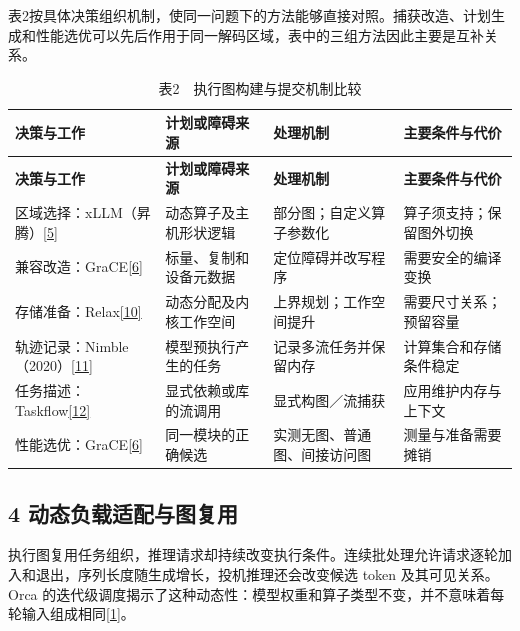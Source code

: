 \documentclass[UTF8,11pt,fontset=windows]{ctexart}
\begin{document}
表2按具体决策组织机制，使同一问题下的方法能够直接对照。捕获改造、计划生成和性能选优可以先后作用于同一解码区域，表中的三组方法因此主要是互补关系。

\begingroup\small
\begin{longtable}[]{@{}>{\raggedright\arraybackslash}p{}>{\raggedright\arraybackslash}p{}>{\raggedright\arraybackslash}p{}>{\raggedright\arraybackslash}p{}@{}}
\caption{表2　执行图构建与提交机制比较}\tabularnewline
\toprule
\textbf{决策与工作} & \textbf{计划或障碍来源} & \textbf{处理机制} & \textbf{主要条件与代价} \\
\midrule
\endfirsthead
\toprule
\textbf{决策与工作} & \textbf{计划或障碍来源} & \textbf{处理机制} & \textbf{主要条件与代价} \\
\midrule
\endhead
区域选择：xLLM（昇腾）\protect\hyperlink{ref-5}{{[}5{]}} & 动态算子及主机形状逻辑 & 部分图；自定义算子参数化 & 算子须支持；保留图外切换 \\
兼容改造：GraCE\protect\hyperlink{ref-6}{{[}6{]}} & 标量、复制和设备元数据 & 定位障碍并改写程序 & 需要安全的编译变换 \\
存储准备：Relax\protect\hyperlink{ref-10}{{[}10{]}} & 动态分配及内核工作空间 & 上界规划；工作空间提升 & 需要尺寸关系；预留容量 \\
轨迹记录：Nimble（2020）\protect\hyperlink{ref-11}{{[}11{]}} & 模型预执行产生的任务 & 记录多流任务并保留内存 & 计算集合和存储条件稳定 \\
任务描述：Taskflow\protect\hyperlink{ref-12}{{[}12{]}} & 显式依赖或库的流调用 & 显式构图／流捕获 & 应用维护内存与上下文 \\
性能选优：GraCE\protect\hyperlink{ref-6}{{[}6{]}} & 同一模块的正确候选 & 实测无图、普通图、间接访问图 & 测量与准备需要摊销 \\
\bottomrule
\end{longtable}
\endgroup

\hypertarget{section-4}{%
\subsection{4 动态负载适配与图复用}\label{section-4}}

执行图复用任务组织，推理请求却持续改变执行条件。连续批处理允许请求逐轮加入和退出，序列长度随生成增长，投机推理还会改变候选 token 及其可见关系。Orca 的迭代级调度揭示了这种动态性：模型权重和算子类型不变，并不意味着每轮输入组成相同\protect\hyperlink{ref-1}{{[}1{]}}。
\end{document}
